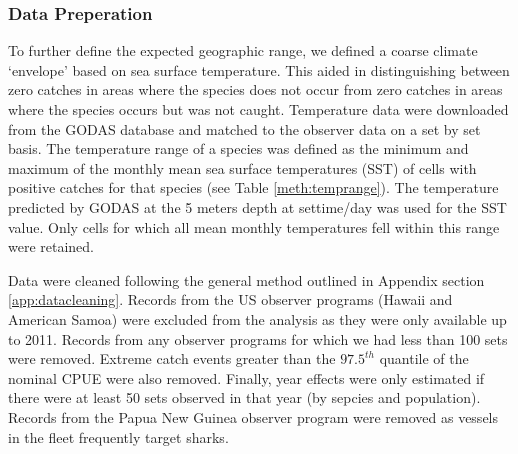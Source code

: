 \subsubsection{Data Preperation}
To further define the expected geographic range, we defined a coarse climate `envelope' based on sea surface temperature. This aided in distinguishing between zero catches in areas where the species does not occur from zero catches in areas where the species occurs but was not caught. Temperature data were downloaded from the GODAS database \citep{GODASXXXX_a} and matched to the observer data on a set by set basis. The temperature range of a species was defined as the minimum and maximum of the monthly mean sea surface temperatures (SST) of cells with positive catches for that species (see Table \ref{meth:temprange}). The temperature predicted by GODAS at the 5 meters depth at settime/day was used for the SST value. Only cells for which all mean monthly temperatures fell within this range were retained. %
                                                                                       
Data were cleaned following the general method outlined in Appendix section \ref{app:datacleaning}. Records from the US observer programs (Hawaii and American Samoa) were excluded from the analysis as they were only available up to 2011. Records from any observer programs for which we had less than 100 sets were removed. Extreme catch events greater than the $97.5^{th}$ quantile of the nominal CPUE were also removed. Finally, year effects were only estimated if there were at least 50 sets observed in that year (by sepcies and population).  Records from the Papua New Guinea observer program were removed as vessels in the fleet frequently target sharks.
                                                                                      
